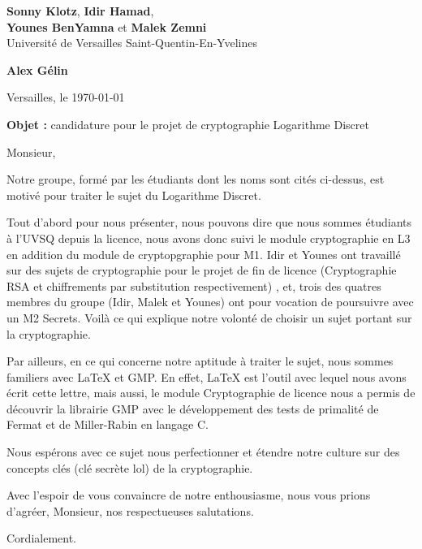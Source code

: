 \documentclass[10pt]{letter}
\begin{document}
\sffamily
	
	\begin{flushleft}
		\singlespacing
		\textbf{Sonny Klotz}, \textbf{Idir Hamad},\\ \textbf{Younes BenYamna} et \textbf{Malek Zemni}\\[.35ex]
		\footnotesize
		Université de Versailles Saint-Quentin-En-Yvelines 
	\end{flushleft}
	
	\begin{flushright}
		\singlespacing
		\textbf{Alex Gélin}\\[.35ex]
	\end{flushright}
 
	\begin{flushright}Versailles, le \today\\\end{flushright}

	\vspace{1em}
	
	\textbf{Objet :} candidature pour le projet de cryptographie \guillemotleft Logarithme Discret\guillemotright
	
	Monsieur,
	
	\hspace{1cm} Notre groupe, formé par les étudiants dont les noms sont cités ci-dessus, est motivé pour traiter le sujet du Logarithme Discret.
	
	\hspace{1cm} Tout d'abord pour nous présenter, nous pouvons dire que nous sommes étudiants à l'UVSQ depuis la licence, nous avons donc suivi le module cryptographie en L3 en addition du module de cryptopgraphie pour M1. Idir et Younes ont travaillé sur des sujets de cryptographie pour le projet de fin de licence (Cryptographie RSA et chiffrements par substitution respectivement) , et, trois des quatres membres du groupe (Idir, Malek et Younes) ont pour vocation de poursuivre avec un M2 Secrets. Voilà ce qui explique notre volonté de choisir un sujet portant sur la cryptographie.
	
	\hspace{1cm} Par ailleurs, en ce qui concerne notre aptitude à traiter le sujet, nous sommes familiers avec LaTeX et GMP. En effet, LaTeX est l'outil avec lequel nous avons écrit cette lettre, mais aussi, le module Cryptographie de licence nous a permis de découvrir la librairie GMP avec le développement des tests de primalité de Fermat et de Miller-Rabin en langage C.
	
	\hspace{1cm} Nous espérons avec ce sujet nous perfectionner et étendre notre culture sur des concepts clés (clé secrète lol) de la cryptographie.
	
	\hspace{1cm} Avec l’espoir de vous convaincre de notre enthousiasme, nous vous prions d’agréer, Monsieur, nos respectueuses salutations.
	
	\begin{flushright}
		Cordialement.
	\end{flushright}
\end{document}
